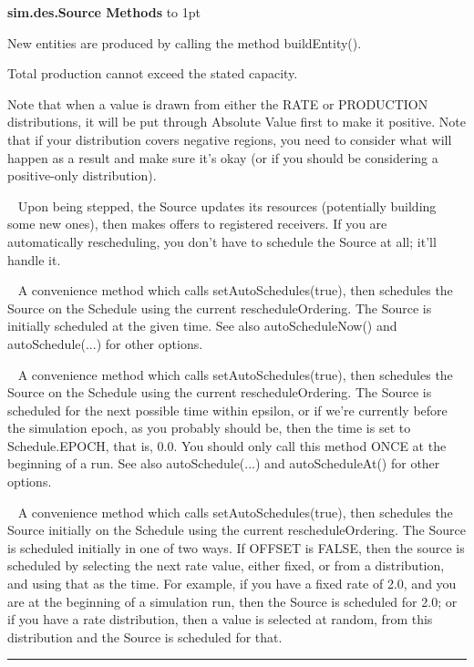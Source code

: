 \documentclass[twoside,10pt]{article}
\newcommand\class[1]{\index{Classes!{#1}}\textsf{#1}}
\newcommand*{\xfill}[1][0pt]{%
	\cleaders
		\hbox to 1pt{\hss
			\raisebox{#1}{\rule{1.2pt}{0.4pt}}%
			\hss}\hfill}
\newenvironment{methods}[1]{
\vspace{1.0em}\noindent\textsf{\textbf{#1 Methods}}\quad \xfill[0.5ex]
\vspace{-0.25em}
\begin{description}
\small}
{\end{description}\hrule\vspace{1.5em}}
\newcommand{\mthd}[1]{\item[{\sf #1}]~\newline}
\begin{document}
\begin{methods}{\class{sim.des.Source}}
        New entities are produced by calling the method buildEntity().
                
        Total production cannot exceed the stated capacity. 
        
        Note that when a value is drawn from either the RATE or PRODUCTION distributions, 
        it will be put through Absolute Value first to make it positive.  Note that if your 
        distribution covers negative regions, you need to consider what will happen as a result and 
        make sure it's okay (or if you should be considering a positive-only distribution).  
        
        
\mthd{public void step(SimState state)}
Upon being stepped, the Source updates its resources (potentially building some new ones), then
        makes offers to registered receivers.  If you are automatically rescheduling, you don't have to
        schedule the Source at all; it'll handle it.
        
\mthd{public void autoScheduleAt(double time)}
A convenience method which calls setAutoSchedules(true), then schedules the Source on the Schedule using 
    	the current rescheduleOrdering.  The Source is initially scheduled at the given time.  
    	See also autoScheduleNow() and autoSchedule(...) for other options.
	
\mthd{public void autoScheduleNow()}
A convenience method which calls setAutoSchedules(true), then schedules the Source on the Schedule using 
    	the current rescheduleOrdering.  The Source is scheduled for the next possible time within epsilon, or 
    	if we're currently before the simulation epoch, as you probably should be, then the time is set to 
    	Schedule.EPOCH, that is, 0.0. You should only call this method ONCE at the beginning of a run.  
    	See also autoSchedule(...) and autoScheduleAt() for other options.
	
\mthd{public void autoSchedule(boolean offset)}
A convenience method which calls setAutoSchedules(true), then schedules the Source initially on the Schedule 
    	using the current rescheduleOrdering.  The Source is scheduled initially in one of two ways.  If OFFSET is 
    	FALSE, then the source is scheduled by selecting the next rate value, either fixed, or from a distribution,
    	and using that as the time.  For example, if you have a fixed rate of 2.0, and you are at the beginning 
    	of a simulation run, then the Source is scheduled for 2.0; or if you have a rate distribution, then a 
    	value is selected at random, from this distribution and the Source is scheduled for that.  
    	

\end{methods}
\end{document}

